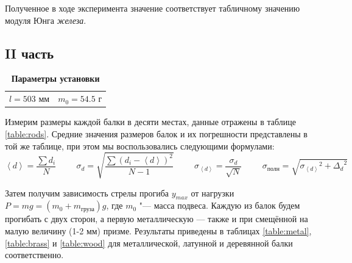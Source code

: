\documentclass[a4paper, 10pt]{article}
\newcommand{\mean}[1]{\left<#1\right>}
\begin{document}
			Полученное в ходе эксперимента значение  соответствует табличному значению модуля Юнга \textit{железа}.

		\subsection*{II часть}
			\begin{table}
				\vspace{-0.5cm}
				\centering
				\caption*{\textbf{Параметры установки}}
				\vspace{-0.25cm}
				\begin{tabular}{cc}
					$l = 503 \text{ мм}$ & $m_0 = 54.5 \text{ г}$ \\
				\end{tabular}
			\end{table}
			
			Измерим размеры каждой балки в десяти местах, данные отражены в таблице \ref{table:rods}. Средние значения размеров балок и их погрешности представлены в той же таблице, при этом мы воспользовались следующими формулами:
			\[\mean{d} = \frac{\sum d_i}{N} \hspace{1cm} \sigma_d = \sqrt{\frac{\sum{\left( d_i - \mean{d}\right)^2}}{N - 1}} \hspace{1cm} \sigma_{\mean{d}} = \frac{\sigma_d}{\sqrt{N}} \hspace{1cm} \sigma_\text{полн} = \sqrt{{\sigma_{\mean d}}^2 + {\Delta_d}^2} \]
			
			Затем получим зависимость стрелы прогиба $y_{max}$ от нагрузки $P= mg = (m_0 + m_\text{груза})g$, где $m_0$ "--- масса подвеса. Каждую из балок будем прогибать с двух сторон, а первую металлическую --- также и при смещённой на малую величину (1-2 мм) призме. Результаты приведены в таблицах \ref{table:metal}, \ref{table:brass} и \ref{table:wood} для металлической, латунной и деревянной балки соответственно.
			\newpage
			
\end{document}
